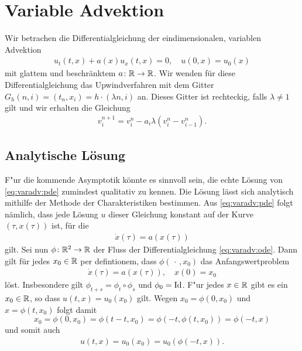 \section{Variable Advektion}

\label{sec:varadv}

Wir betrachen die Differentialgleichung der eindimensionalen, variablen Advektion
\begin{align}\label{eq:varadv:pde}
u_t(t,x) + a(x) u_x(t,x) = 0, \quad u(0,x) = u_0(x)
\end{align}
mit glattem und beschränktem $a\colon \mathbb R \to \mathbb R$.
Wir wenden für diese Differentialgleichung das Upwindverfahren mit dem Gitter $G_h(n,i) = (t_n, x_i) = h \cdot (\lambda n,i)$ an.
Dieses Gitter ist rechteckig, falls $\lambda \neq 1$ gilt und wir erhalten die Gleichung
\begin{align}\label{eq:varadv:verfahren}
v^{n+1}_i = v^n_i - a_i \lambda \left( v^n_i - v^n_{i-1} \right).
\end{align}

\subsection{Analytische Lösung}

F"ur die kommende Asymptotik könnte es sinnvoll sein, die echte Lösung von \eqref{eq:varadv:pde} zumindest qualitativ zu kennen.
Die Lösung lässt sich analytisch mithilfe der Methode der Charakteristiken bestimmen.
Aus \eqref{eq:varadv:pde} folgt nämlich, dass jede Lösung $u$ dieser Gleichung konstant auf der Kurve $(\tau, x(\tau))$ ist, für die
\begin{align} \label{eq:varadv:ode}
\dot x(\tau) = a(x(\tau))
\end{align} gilt.
Sei nun $\phi\colon \mathbb R^2 \to \mathbb R$ der Fluss der Differentialgleichung \eqref{eq:varadv:ode}.
Dann gilt für jedes $x_0 \in \mathbb R$ per defintionem, dass $\phi(\, \cdot \,,x_0)$ das Anfangswertproblem \begin{align}\label{eq:varadv:ivp} \dot x(\tau) = a(x(\tau)), \quad x(0) = x_0 \end{align} löst.
Insbesondere gilt $\phi_{t+s} = \phi_t \circ \phi_s$ und $\phi_0 = \operatorname{Id}$.
F"ur jedes $x \in \mathbb R$ gibt es ein $x_0 \in \mathbb R$, so dass $u(t,x) = u_0(x_0)$ gilt.
Wegen $x_0 = \phi(0,x_0)$ und $x = \phi(t, x_0)$ folgt damit \[ x_0 = \phi(0, x_0) = \phi(t - t, x_0) = \phi(-t, \phi(t, x_0)) = \phi(-t, x) \] und somit auch \begin{align}\label{eq:varadv:analytic_solution} u(t,x) = u_0(x_0) = u_0(\phi(-t, x)).\end{align}

